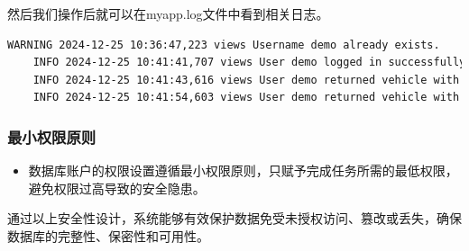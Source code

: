 \documentclass[UTF8,a4paper,12pt]{ctexart}
\begin{document}
然后我们操作后就可以在myapp.log文件中看到相关日志。

\begin{lstlisting}[language=bash]
    WARNING 2024-12-25 10:36:47,223 views Username demo already exists.
    INFO 2024-12-25 10:41:41,707 views User demo logged in successfully.
    INFO 2024-12-25 10:41:43,616 views User demo returned vehicle with ID XPENG001.
    INFO 2024-12-25 10:41:54,603 views User demo returned vehicle with ID XPENG001.
\end{lstlisting}

\subsubsection{最小权限原则}
\begin{itemize}
    \item 数据库账户的权限设置遵循最小权限原则，只赋予完成任务所需的最低权限，避免权限过高导致的安全隐患。
\end{itemize}

通过以上安全性设计，系统能够有效保护数据免受未授权访问、篡改或丢失，确保数据库的完整性、保密性和可用性。
\end{document}
